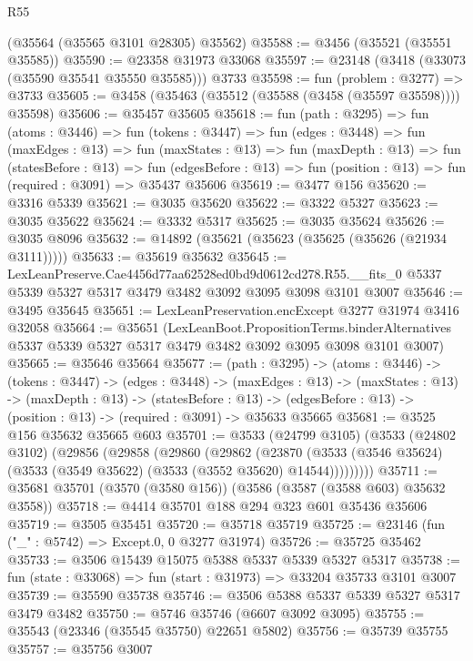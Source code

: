\begin{lexlean}{R55}
\begin{coremodule}
    (@35564 (@35565 @3101 @28305) @35562)
@35588 := @3456 (@35521 (@35551 @35585))
@35590 := @23358 @31973 @33068
@35597 := @23148 (@3418 (@33073 (@35590 @35541 @35550 @35585))) @3733
@35598 := fun (problem : @3277) => @3733
@35605 := @3458 (@35463 (@35512 (@35588 (@3458 (@35597 @35598)))) @35598)
@35606 := @35457 @35605
@35618 := fun (path : @3295) =>
  fun (atoms : @3446) =>
  fun (tokens : @3447) =>
  fun (edges : @3448) =>
  fun (maxEdges : @13) =>
  fun (maxStates : @13) =>
  fun (maxDepth : @13) =>
  fun (statesBefore : @13) =>
  fun (edgesBefore : @13) => fun (position : @13) => fun (required : @3091) => @35437 @35606
@35619 := @3477 @156
@35620 := @3316 @5339
@35621 := @3035 @35620
@35622 := @3322 @5327
@35623 := @3035 @35622
@35624 := @3332 @5317
@35625 := @3035 @35624
@35626 := @3035 @8096
@35632 := @14892 (@35621 (@35623 (@35625 (@35626 (@21934 @3111)))))
@35633 := @35619 @35632
@35645 := LexLeanPreserve.Cae4456d77aa62528ed0bd9d0612cd278.R55.__fits_0
    @5337
    @5339
    @5327
    @5317
    @3479
    @3482
    @3092
    @3095
    @3098
    @3101
    @3007
@35646 := @3495 @35645
@35651 := LexLeanPreservation.encExcept @3277 @31974 @3416 @32058
@35664 := @35651
    (LexLeanBoot.PropositionTerms.binderAlternatives
      @5337
      @5339
      @5327
      @5317
      @3479
      @3482
      @3092
      @3095
      @3098
      @3101
      @3007)
@35665 := @35646 @35664
@35677 := (path : @3295) ->
  (atoms : @3446) ->
  (tokens : @3447) ->
  (edges : @3448) ->
  (maxEdges : @13) ->
  (maxStates : @13) ->
  (maxDepth : @13) ->
  (statesBefore : @13) ->
  (edgesBefore : @13) -> (position : @13) -> (required : @3091) -> @35633 @35665
@35681 := @3525 @156 @35632 @35665 @603
@35701 := @3533
    (@24799 @3105)
    (@3533
      (@24802 @3102)
      (@29856
        (@29858
          (@29860
            (@29862
              (@23870
                (@3533 (@3546 @35624) (@3533 (@3549 @35622) (@3533 (@3552 @35620) @14544)))))))))
@35711 := @35681 @35701 (@3570 (@3580 @156)) (@3586 (@3587 (@3588 @603) @35632 @3558))
@35718 := @4414 @35701 @188 @294 @323 @601 @35436 @35606
@35719 := @3505 @35451
@35720 := @35718 @35719
@35725 := @23146 (fun ("_" : @5742) => Except.{0, 0} @3277 @31974)
@35726 := @35725 @35462
@35733 := @3506 @15439 @15075 @5388 @5337 @5339 @5327 @5317
@35738 := fun (state : @33068) => fun (start : @31973) => @33204 @35733 @3101 @3007
@35739 := @35590 @35738
@35746 := @3506 @5388 @5337 @5339 @5327 @5317 @3479 @3482
@35750 := @5746 @35746 (@6607 @3092 @3095)
@35755 := @35543 (@23346 (@35545 @35750) @22651 @5802)
@35756 := @35739 @35755
@35757 := @35756 @3007

\end{coremodule}
\end{lexlean}
